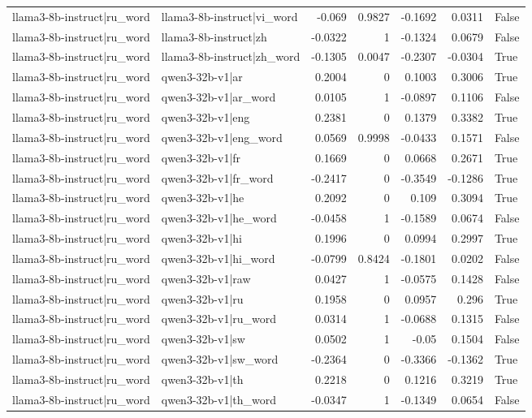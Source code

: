 \begin{table}
\begin{tabular}{l l r r r r l}
llama3-8b-instruct|ru_word & llama3-8b-instruct|vi_word & -0.069 & 0.9827 & -0.1692 & 0.0311 & False \\
llama3-8b-instruct|ru_word & llama3-8b-instruct|zh & -0.0322 & 1 & -0.1324 & 0.0679 & False \\
llama3-8b-instruct|ru_word & llama3-8b-instruct|zh_word & -0.1305 & 0.0047 & -0.2307 & -0.0304 & True \\
llama3-8b-instruct|ru_word & qwen3-32b-v1|ar & 0.2004 & 0 & 0.1003 & 0.3006 & True \\
llama3-8b-instruct|ru_word & qwen3-32b-v1|ar_word & 0.0105 & 1 & -0.0897 & 0.1106 & False \\
llama3-8b-instruct|ru_word & qwen3-32b-v1|eng & 0.2381 & 0 & 0.1379 & 0.3382 & True \\
llama3-8b-instruct|ru_word & qwen3-32b-v1|eng_word & 0.0569 & 0.9998 & -0.0433 & 0.1571 & False \\
llama3-8b-instruct|ru_word & qwen3-32b-v1|fr & 0.1669 & 0 & 0.0668 & 0.2671 & True \\
llama3-8b-instruct|ru_word & qwen3-32b-v1|fr_word & -0.2417 & 0 & -0.3549 & -0.1286 & True \\
llama3-8b-instruct|ru_word & qwen3-32b-v1|he & 0.2092 & 0 & 0.109 & 0.3094 & True \\
llama3-8b-instruct|ru_word & qwen3-32b-v1|he_word & -0.0458 & 1 & -0.1589 & 0.0674 & False \\
llama3-8b-instruct|ru_word & qwen3-32b-v1|hi & 0.1996 & 0 & 0.0994 & 0.2997 & True \\
llama3-8b-instruct|ru_word & qwen3-32b-v1|hi_word & -0.0799 & 0.8424 & -0.1801 & 0.0202 & False \\
llama3-8b-instruct|ru_word & qwen3-32b-v1|raw & 0.0427 & 1 & -0.0575 & 0.1428 & False \\
llama3-8b-instruct|ru_word & qwen3-32b-v1|ru & 0.1958 & 0 & 0.0957 & 0.296 & True \\
llama3-8b-instruct|ru_word & qwen3-32b-v1|ru_word & 0.0314 & 1 & -0.0688 & 0.1315 & False \\
llama3-8b-instruct|ru_word & qwen3-32b-v1|sw & 0.0502 & 1 & -0.05 & 0.1504 & False \\
llama3-8b-instruct|ru_word & qwen3-32b-v1|sw_word & -0.2364 & 0 & -0.3366 & -0.1362 & True \\
llama3-8b-instruct|ru_word & qwen3-32b-v1|th & 0.2218 & 0 & 0.1216 & 0.3219 & True \\
llama3-8b-instruct|ru_word & qwen3-32b-v1|th_word & -0.0347 & 1 & -0.1349 & 0.0654 & False \\

\end{tabular}
\end{table}
